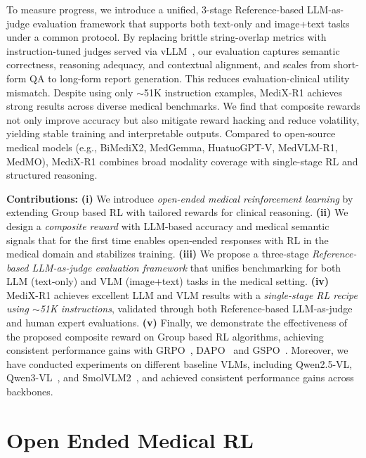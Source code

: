 \documentclass{article}
\theoremstyle{plain}
\theoremstyle{definition}
\theoremstyle{remark}
\begin{document}
To measure progress, we introduce a unified, 3-stage Reference-based LLM-as-judge evaluation framework that supports both text-only and image+text tasks under a common protocol. By replacing brittle string-overlap metrics with instruction-tuned judges served via vLLM~\citep{kwon2023efficient}, our evaluation captures semantic correctness, reasoning adequacy, and contextual alignment, and scales from short-form QA to long-form report generation. This reduces evaluation-clinical utility mismatch. Despite using only $\sim$51K instruction examples, MediX-R1 achieves strong results across diverse medical benchmarks. We find that composite rewards not only improve accuracy but also mitigate reward hacking and reduce volatility, yielding stable training and interpretable outputs. Compared to open-source medical models (e.g., BiMediX2, MedGemma, HuatuoGPT-V, MedVLM-R1, MedMO), MediX-R1 combines broad modality coverage with single-stage RL and structured reasoning.

\textbf{Contributions:}  \textbf{(i)} We introduce \textit{open-ended medical reinforcement learning} by extending Group based RL with tailored rewards for clinical reasoning. \textbf{(ii)} We design a \textit{composite reward} with LLM-based accuracy and medical semantic signals that for the first time enables open-ended responses with RL in the medical domain and stabilizes training. \textbf{(iii)} We propose a three-stage \textit{Reference-based LLM-as-judge evaluation framework} that unifies benchmarking for both LLM (text-only) and VLM (image+text) tasks in the medical setting. \textbf{(iv)} MediX-R1 achieves excellent LLM and VLM results with a \textit{single-stage RL recipe using $\sim$51K instructions}, validated through both Reference-based LLM-as-judge and human expert evaluations. \textbf{(v)}  Finally, we demonstrate the effectiveness of the proposed composite reward on Group based RL algorithms, achieving consistent performance gains with GRPO~\citep{shao2024deepseekmath}, DAPO~\citep{yu2025dapoopensourcellmreinforcement} and GSPO~\citep{zheng2025groupsequencepolicyoptimization}. Moreover, we have conducted experiments on different baseline VLMs, including Qwen2.5-VL, Qwen3-VL~\citep{qwen3technicalreport}, and SmolVLM2~\citep{marafioti2025smolvlmredefiningsmallefficient}, and achieved consistent performance gains across \mbox{backbones.}

\section{Open Ended Medical RL}
\end{document}
